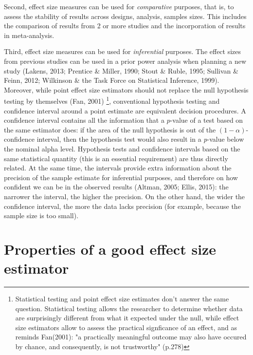 \documentclass[
  man,floatsintext]{apa6}
\begin{document}
Second, effect size measures can be used for \emph{comparative} purposes, that is, to assess the stability of results across designs, analysis, samples sizes. This includes the comparison of results from 2 or more studies and the incorporation of results in meta-analysis.

Third, effect size measures can be used for \emph{inferential} purposes. The effect sizes from previous studies can be used in a prior power analysis when planning a new study (Lakens, 2013; Prentice \& Miller, 1990; Stout \& Ruble, 1995; Sullivan \& Feinn, 2012; Wilkinson \& the Task Force on Statistical Inference, 1999). Moreover, while point effect size estimators should not replace the null hypothesis testing by themselves (Fan, 2001) \footnote{Statistical testing and point effect size estimates don't answer the same question. Statistical testing allows the researcher to determine whether data are surprisingly different from what it expected under the null, while effect size estimators allow to assess the practical signficance of an effect, and as reminds Fan(2001):  "a practically meaningful outcome may also have occured by chance, and consequently, is not trustworthy" (p.278)}, conventional hypothesis testing and confidence interval around a point estimate are equivalent decision procedures. A confidence interval contains all the information that a \(p\)-value of a test based on the same estimator does: if the area of the null hypothesis is out of the \((1-\alpha)\)-confidence interval, then the hypothesis test would also result in a \emph{p}-value below the nominal alpha level. Hypothesis tests and confidence intervals based on the same statistical quantity (this is an essential requirement) are thus directly related. At the same time, the intervals provide extra information about the precision of the sample estimate for inferential purposes, and therefore on how confident we can be in the observed results (Altman, 2005; Ellis, 2015): the narrower the interval, the higher the precision. On the other hand, the wider the confidence interval, the more the data lacks precision (for example, because the sample size is too small).

\hypertarget{properties-of-a-good-effect-size-estimator}{%
\section{Properties of a good effect size estimator}\label{properties-of-a-good-effect-size-estimator}}
\end{document}
